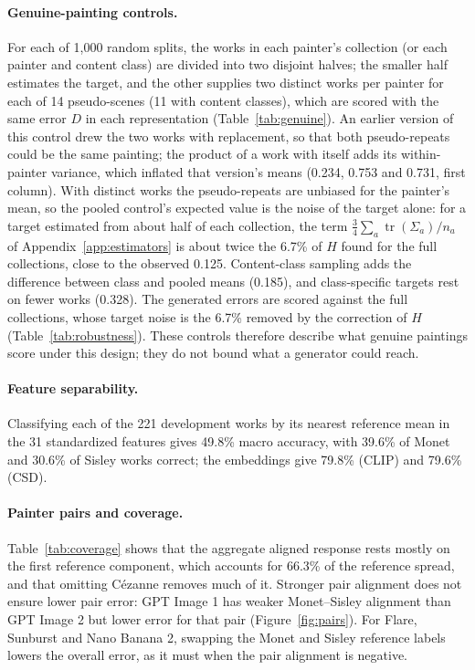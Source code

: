 \paragraph{Genuine-painting controls.} For each of 1,000 random splits, the works in each
painter's collection (or each painter and content class) are divided into two disjoint halves;
the smaller half estimates the target, and the other supplies two distinct works per painter for
each of 14 pseudo-scenes (11 with content classes), which are scored with the same error $D$ in
each representation (Table~\ref{tab:genuine}). An earlier version of this control drew the two
works with replacement, so that both pseudo-repeats could be the same painting; the product of a
work with itself adds its within-painter variance, which inflated that version's means (0.234,
0.753 and 0.731, first column). With distinct works the pseudo-repeats are unbiased for the
painter's mean, so the pooled control's expected value is the noise of the target alone: for a
target estimated from about half of each collection, the term $\frac34\sum_a\operatorname{tr}
(\Sigma_a)/n_a$ of Appendix~\ref{app:estimators} is about twice the 6.7\% of $H$ found for the full
collections, close to the observed 0.125. Content-class sampling adds the difference between class
and pooled means (0.185), and class-specific targets rest on fewer works (0.328). The generated
errors are scored against the full collections, whose target noise is the 6.7\% removed by the
correction of $H$ (Table~\ref{tab:robustness}). These controls therefore describe what genuine
paintings score under this design; they do not bound what a generator could reach.

\paragraph{Feature separability.} Classifying each of the 221 development works by its nearest
reference mean in the 31 standardized features gives 49.8\% macro accuracy, with 39.6\% of Monet
and 30.6\% of Sisley works correct; the embeddings give 79.8\% (CLIP) and 79.6\% (CSD).

\paragraph{Painter pairs and coverage.} Table~\ref{tab:coverage} shows that the aggregate
aligned response rests mostly on the first reference component, which accounts for 66.3\% of
the reference spread, and that omitting C\'ezanne removes much of it. Stronger pair alignment
does not ensure lower pair error: GPT Image 1 has weaker Monet--Sisley alignment than GPT Image
2 but lower error for that pair (Figure~\ref{fig:pairs}). For Flare, Sunburst and Nano Banana
2, swapping the Monet and Sisley reference labels lowers the overall error, as it must when the
pair alignment is negative.

